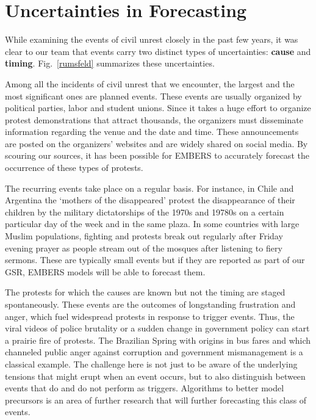 \section{Uncertainties in Forecasting}
While examining the events of civil unrest closely
in the past few years, it was clear to our
team that events carry two distinct types of uncertainties: {\bf cause} 
and {\bf timing}.
Fig.~\ref{rumsfeld} summarizes these uncertainties.

Among all the incidents of civil unrest that we encounter, the largest and the most significant ones 
are planned events.  These events are usually organized by political parties, labor and student unions.  
Since it takes a huge effort to organize protest demonstrations that 
attract thousands, the organizers must disseminate information regarding the venue 
and the date and time.  These announcements are posted on the organizers’ websites and 
are widely shared on social media.  By scouring our sources,
it has been possible for EMBERS to accurately forecast the occurrence of these types of protests.

The recurring events take place on a regular basis.  For instance, in Chile and Argentina the 
`mothers of the disappeared' protest the disappearance of their children by the military dictatorships 
of the 1970s and 19780s on a certain particular day of the week and in the same plaza. 
In some countries with large Muslim populations, fighting and protests break out regularly after 
Friday evening prayer as people stream out of the mosques after listening 
to fiery sermons. These are typically small events but if they are reported as part of our GSR,
EMBERS models will be able to forecast them.

The protests for which the causes are known but not the timing are staged spontaneously.  These 
events are the outcomes of longstanding frustration and anger, which fuel widespread 
protests in response to trigger events.  Thus, the viral videos of police brutality or 
a sudden change in government policy can start a prairie fire of protests.  The Brazilian
Spring with origins in bus fares and which channeled
public anger against corruption and government mismanagement is a classical example. The challenge here
is not just to be aware of the underlying tensions that might erupt when an event occurs, but to also
distinguish between events that do and do not perform as triggers. Algorithms to better model
precursors is an area of further research that will further forecasting this class of events.

